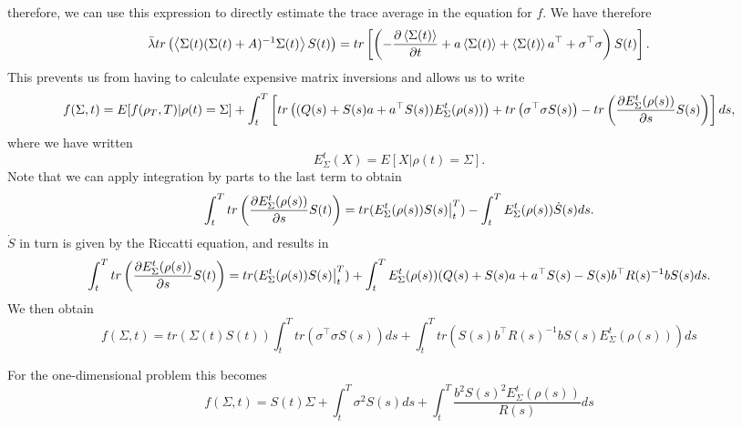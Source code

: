 therefore, we can use this expression to directly estimate the trace average in the equation for $f$. We have therefore
\[
\bar{\lambda} tr\left(\left<\Sigma(t)(\Sigma(t) + A)^{-1} \Sigma(t)\right>S(t)\right) = tr\left[\left(-\frac{\partial \left<\Sigma(t)\right>}{\partial t} + a \left<\Sigma(t)\right> + \left<\Sigma(t)\right> a^\top + \sigma^\top\sigma\right)S(t)\right]. 
\]
This prevents us from having to calculate expensive matrix inversions and allows us to write
\[
f(\Sigma,t) =E[f(\rho_T,T)|\rho(t)=\Sigma] + \int_t^T\left[ tr\left((Q(s)+S(s)a + a^\top S(s))E^t_{\Sigma}(\rho(s))\right) +tr\left(\sigma^\top \sigma S(s)\right)-tr\left( \frac{\partial E^t_\Sigma(\rho(s))}{\partial s} S(s)\right)\right]ds,
\]
where we have written
\[
E^t_\Sigma(X) = E[X|\rho(t)=\Sigma].
\]
Note that we can apply integration by parts to the last term to obtain
\[
\int_t^T tr\left( \frac{\partial E^t_\Sigma(\rho(s))}{\partial s} S(t)\right) = tr(E^t_\Sigma(\rho(s)) S(s)\big|_t^T) - \int_t^T E^t_\Sigma(\rho(s)) \dot{S}(s)ds.
\]
$\dot{S}$ in turn is given by the Riccatti equation, and results in
\[
\int_t^T tr\left( \frac{\partial E^t_\Sigma(\rho(s))}{\partial s} S(t)\right) =  tr(E^t_\Sigma(\rho(s)) S(s)\big|_t^T) + \int_t^T E^t_\Sigma(\rho(s)) (Q(s) + S(s) a + a^\top S(s) -S(s) b^\top R(s)^{-1} b S(s)ds.
\]
We then obtain
\[
f(\Sigma,t)  = tr\left(\Sigma(t) S(t)\right) \int_t^T tr\left(\sigma^\top\sigma S(s)\right)ds+ \int_t^T tr \left(S(s) b^\top R(s)^{-1}b S(s) E^t_\Sigma(\rho(s))\right) ds
\]

For the one-dimensional problem this becomes
\[
f(\Sigma,t) = S(t) \Sigma + \int_t^T \sigma^2 S(s) ds +\int_t^T \frac{b^2 S(s)^2 E^t_\Sigma(\rho(s))}{R(s)}ds 
\]

